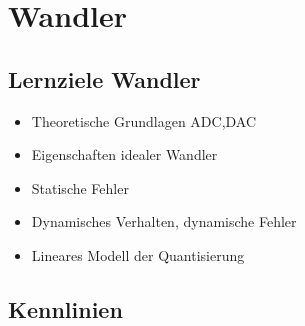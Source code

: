 \section{Wandler}

\subsection{Lernziele Wandler}
\begin{itemize}
\item Theoretische Grundlagen ADC,DAC
\item Eigenschaften idealer Wandler
\item Statische Fehler
\item Dynamisches Verhalten, dynamische Fehler
\item Lineares Modell der Quantisierung 
\end{itemize}


\subsection{Kennlinien}




